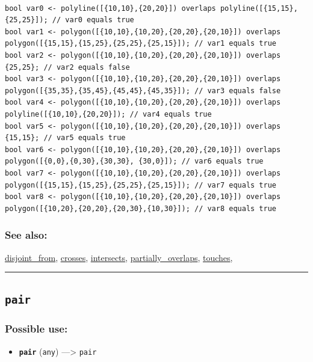 \documentclass[]{book}
\providecommand{\tightlist}{%
  \setlength{\itemsep}{0pt}\setlength{\parskip}{0pt}}
\theoremstyle{definition}
\theoremstyle{definition}
\theoremstyle{definition}
\theoremstyle{remark}
\begin{document}
\begin{verbatim}
 
bool var0 <- polyline([{10,10},{20,20}]) overlaps polyline([{15,15},{25,25}]); // var0 equals true 
bool var1 <- polygon([{10,10},{10,20},{20,20},{20,10}]) overlaps polygon([{15,15},{15,25},{25,25},{25,15}]); // var1 equals true 
bool var2 <- polygon([{10,10},{10,20},{20,20},{20,10}]) overlaps {25,25}; // var2 equals false 
bool var3 <- polygon([{10,10},{10,20},{20,20},{20,10}]) overlaps polygon([{35,35},{35,45},{45,45},{45,35}]); // var3 equals false 
bool var4 <- polygon([{10,10},{10,20},{20,20},{20,10}]) overlaps polyline([{10,10},{20,20}]); // var4 equals true 
bool var5 <- polygon([{10,10},{10,20},{20,20},{20,10}]) overlaps {15,15}; // var5 equals true 
bool var6 <- polygon([{10,10},{10,20},{20,20},{20,10}]) overlaps polygon([{0,0},{0,30},{30,30}, {30,0}]); // var6 equals true 
bool var7 <- polygon([{10,10},{10,20},{20,20},{20,10}]) overlaps polygon([{15,15},{15,25},{25,25},{25,15}]); // var7 equals true 
bool var8 <- polygon([{10,10},{10,20},{20,20},{20,10}]) overlaps polygon([{10,20},{20,20},{20,30},{10,30}]); // var8 equals true
\end{verbatim}

\subsubsection{See also:}\label{see-also-157}

\href{operators-d-to-h.html\#disjoint_from}{disjoint\_from},
\href{operators-b-to-c.html\#crosses}{crosses},
\href{operators-i-to-m.html\#intersects}{intersects},
\href{operators-n-to-r.html\#partially_overlaps}{partially\_overlaps},
\href{operators-s-to-z.html\#touches}{touches},

\begin{center}\rule{0.5\linewidth}{\linethickness}\end{center}

\subsection{\texorpdfstring{\texttt{pair}}{pair}}\label{pair}

\subsubsection{Possible use:}\label{possible-use-392}

\begin{itemize}
\tightlist
\item
  \textbf{\texttt{pair}} (\texttt{any}) ---\textgreater{} \texttt{pair}
\end{itemize}
\end{document}
